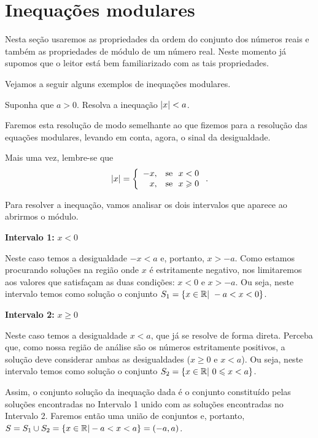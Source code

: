  \section{Inequações modulares}

 Nesta seção usaremos as propriedades da ordem do conjunto dos números reais e também as propriedades de módulo de um número real. Neste momento já supomos que o leitor está bem familiarizado com as tais propriedades.%

Vejamos a seguir alguns exemplos de inequações modulares.

 \begin{exem} 
  Suponha que $a> 0$. Resolva a inequação $\left|x\right| < a$.

Faremos esta resolução de modo semelhante ao que fizemos para a resolução das equações modulares, levando em conta, agora, o sinal da desigualdade.

Mais uma vez, lembre-se que 
 \[
\left|x\right|= \left\{\begin{array}{rl}
      -x , & \text{se} \ \ x<0 \\
      x , & \text{se} \ \ x \geqslant 0
     \end{array}\right. .
\]

Para resolver a inequação, vamos analisar os dois intervalos que aparece ao abrirmos o módulo.

\textbf{Intervalo 1:} $x < 0$

Neste caso temos a desigualdade $-x < a$ e, portanto, $x > -a$. Como estamos procurando soluções na região onde $x$ é estritamente negativo, nos limitaremos aos valores que satisfaçam as duas condições: $x < 0$ e $x > -a$. Ou seja, neste intervalo temos como solução o conjunto $S_1 = \{x \in \mathbb{R} | \ -a < x < 0\}$.

\textbf{Intervalo 2:} $x\geq 0$

Neste caso temos a desigualdade $x<a$, que já se resolve de forma direta. Perceba que, como nossa região de análise são os números estritamente positivos, a solução deve considerar ambas as desigualdades ($x \geq 0$ e $x < a$). Ou seja, neste intervalo temos como solução o conjunto $S_2 = \{x \in \mathbb{R} | \ 0 \leqslant x < a\}$.

Assim, o conjunto solução da inequação dada é o conjunto constituído pelas soluções encontradas no Intervalo 1 unido com as soluções encontradas no Intervalo 2. Faremos então uma união de conjuntos e, portanto, $S = S_1 \cup S_2 = \{x \in \mathbb{R}| -a < x < a\} = (-a,a)$.


\end{exem}
